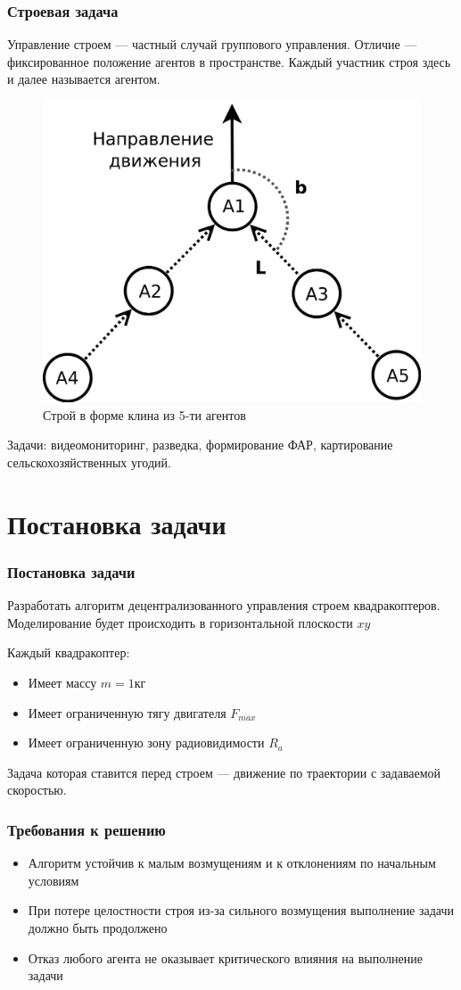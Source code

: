 \documentclass[10pt]{beamer}
\begin{document}
\begin{frame}
	\frametitle{Строевая задача}
	Управление строем — частный случай группового управления. Отличие — фиксированное положение агентов в пространстве.
	Каждый участник строя здесь и далее называется агентом.
\begin{figure}
	
	\centering
	\includegraphics[width=0.40\linewidth]{platoon/wedge-platoon-prez}
	\caption{Строй в форме клина из 5-ти агентов}
	\label{fig:wedge-platoon-prez}
\end{figure}
Задачи: видеомониторинг, разведка, формирование ФАР, картирование сельскохозяйственных угодий.
\end{frame}
\section{Постановка задачи}
\begin{frame}
	\frametitle{Постановка задачи}
	Разработать алгоритм децентрализованного управления строем квадракоптеров. Моделирование будет происходить в горизонтальной плоскости $xy$ \par
	\bigskip
	Каждый квадракоптер:
	\begin{itemize}
		\item Имеет массу $m=1\text{кг}$
		\item Имеет ограниченную тягу двигателя $F_{max}$
		\item Имеет ограниченную зону радиовидимости $R_a$
	\end{itemize}
	\bigskip
	Задача которая ставится перед строем — движение по траектории с задаваемой скоростью.
\end{frame}
\begin{frame}
	\frametitle{Требования к решению}
	\begin{itemize}
		\item Алгоритм устойчив к малым возмущениям и к отклонениям по начальным условиям
		\item При потере целостности строя из-за сильного возмущения выполнение задачи должно быть продолжено
		\item Отказ любого агента не оказывает критического влияния на выполнение задачи
	\end{itemize}
\end{frame}
\end{document}
